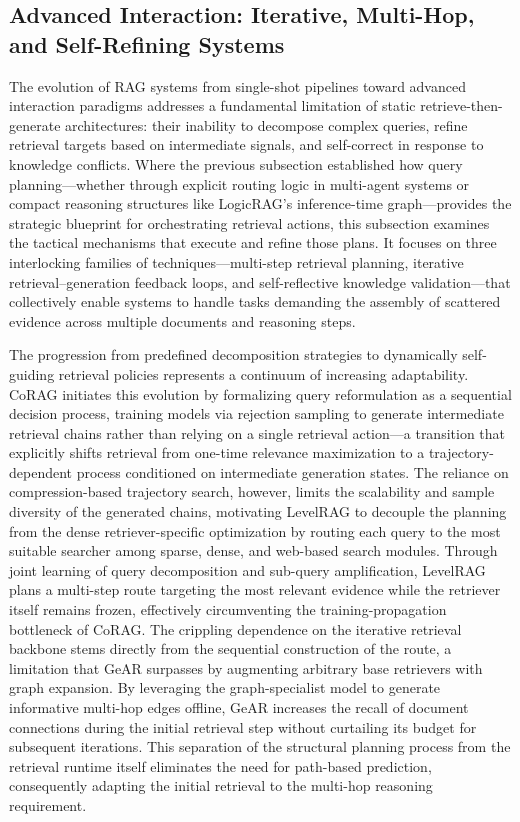 \documentclass[11pt,a4paper]{article}
\begin{document}
\subsection{Advanced Interaction: Iterative, Multi-Hop, and Self-Refining Systems}


The evolution of RAG systems from single-shot pipelines toward advanced interaction paradigms addresses a fundamental limitation of static retrieve-then-generate architectures: their inability to decompose complex queries, refine retrieval targets based on intermediate signals, and self-correct in response to knowledge conflicts. Where the previous subsection established how query planning---whether through explicit routing logic in multi-agent systems or compact reasoning structures like LogicRAG's inference-time graph---provides the strategic blueprint for orchestrating retrieval actions, this subsection examines the tactical mechanisms that execute and refine those plans. It focuses on three interlocking families of techniques---multi-step retrieval planning, iterative retrieval--generation feedback loops, and self-reflective knowledge validation---that collectively enable systems to handle tasks demanding the assembly of scattered evidence across multiple documents and reasoning steps.

The progression from predefined decomposition strategies to dynamically self-guiding retrieval policies represents a continuum of increasing adaptability. CoRAG initiates this evolution by formalizing query reformulation as a sequential decision process, training models via rejection sampling to generate intermediate retrieval chains rather than relying on a single retrieval action---a transition that explicitly shifts retrieval from one-time relevance maximization to a trajectory-dependent process conditioned on intermediate generation states. The reliance on compression-based trajectory search, however, limits the scalability and sample diversity of the generated chains, motivating LevelRAG to decouple the planning from the dense retriever-specific optimization by routing each query to the most suitable searcher among sparse, dense, and web-based search modules. Through joint learning of query decomposition and sub-query amplification, LevelRAG plans a multi-step route targeting the most relevant evidence while the retriever itself remains frozen, effectively circumventing the training-propagation bottleneck of CoRAG. The crippling dependence on the iterative retrieval backbone stems directly from the sequential construction of the route, a limitation that GeAR surpasses by augmenting arbitrary base retrievers with graph expansion. By leveraging the graph-specialist model to generate informative multi-hop edges offline, GeAR increases the recall of document connections during the initial retrieval step without curtailing its budget for subsequent iterations. This separation of the structural planning process from the retrieval runtime itself eliminates the need for path-based prediction, consequently adapting the initial retrieval to the multi-hop reasoning requirement.
\end{document}

